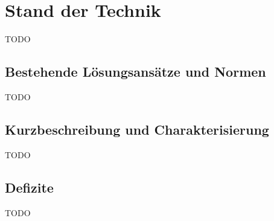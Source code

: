 \section{Stand der Technik}
\label{sec:Stand der Technik}
TODO

\subsection{Bestehende Lösungsansätze und Normen}
\label{sub:Bestehende Lösungsansätze und Normen}
TODO

\subsection{Kurzbeschreibung und Charakterisierung}
\label{sub:Kurzbeschreibung und Charakterisierung}
TODO

\subsection{Defizite}
\label{sub:Defizite}
TODO
